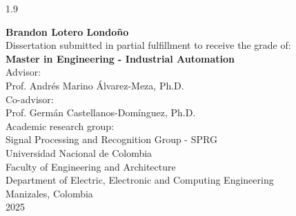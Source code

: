 \begin{center}

  \thispagestyle{empty}
  \vspace*{2cm}

  \begin{spacing}{1.9}
    \textbf{\huge \thesistitle}\\[1.0cm]
  \end{spacing}

  \Large
  \textbf{Brandon Lotero Londoño}\\[3.0cm]

  \small
  Dissertation submitted in partial fulfillment to receive the grade of:\\
  \textbf{Master in Engineering - Industrial Automation}\\[1cm]

  Advisor:\\
  Prof. Andrés Marino Álvarez-Meza, Ph.D.\\[0.25cm]

  Co-advisor:\\
  Prof. Germán Castellanos-Domínguez, Ph.D.\\[1cm]

  Academic research group:\\
  Signal Processing and Recognition Group - SPRG\\[1cm]

  Universidad Nacional de Colombia\\
  Faculty of Engineering and Architecture\\
  Department of Electric, Electronic and Computing Engineering\\
  Manizales, Colombia\\
  2025\\

\end{center}

\newpage{\pagestyle{empty}\cleardoublepage}
\newpage

